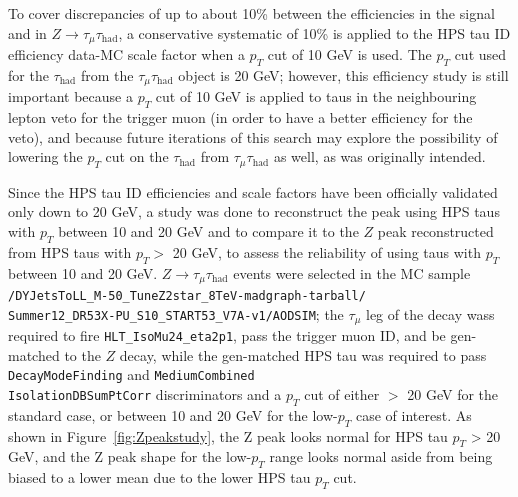 To cover discrepancies of up to about 10\% between the efficiencies in the signal and in $Z\rightarrow\tau_{\mu}\tau_{\text{had}}$, a conservative systematic of 10\% is applied to the HPS tau ID efficiency data-MC scale factor when a $p_T$ cut of 10 GeV is used. The $p_T$ cut used for the $\tau_{\text{had}}$ from the $\tau_{\mu}\tau_{\text{had}}$ object is 20 GeV; however, this efficiency study is still important because a $p_T$ cut of 10 GeV is applied to taus in the neighbouring lepton veto for the trigger muon (in order to have a better efficiency for the veto), and because future iterations of this search may explore the possibility of lowering the $p_T$ cut on the $\tau_{\text{had}}$ from $\tau_{\mu}\tau_{\text{had}}$ as well, as was originally intended.

Since the HPS tau ID efficiencies and scale factors have been officially validated only down to 20 GeV, a study was done to reconstruct the \Z peak using HPS taus with $p_T$ between 10 and 20 GeV and to compare it to the $Z$ peak reconstructed from HPS taus with $p_T >$ 20 GeV, to assess the reliability of using taus with $p_T$ between 10 and 20 GeV. $Z\rightarrow\tau_{\mu}\tau_{\text{had}}$ events were selected in the MC sample \texttt{/DYJetsToLL\_M-50\_TuneZ2star\_8TeV-madgraph-tarball/\\Summer12\_DR53X-PU\_S10\_START53\_V7A-v1/AODSIM}; the $\tau_{\mu}$ leg of the \Z decay wass required to fire \texttt{HLT\_IsoMu24\_eta2p1}, pass the trigger muon ID, and be gen-matched to the $Z$ decay, while the gen-matched HPS tau was required to pass \texttt{DecayModeFinding} and \texttt{MediumCombined\\IsolationDBSumPtCorr} discriminators and a $p_T$ cut of either $>$ 20 GeV for the standard case, or between 10 and 20 GeV for the low-$p_T$ case of interest. As shown in Figure~\ref{fig:Zpeakstudy}, the Z peak looks normal for HPS tau $p_T$ \textgreater\xspace 20 GeV, and the Z peak shape for the low-$p_T$ range looks normal aside from being biased to a lower mean due to the lower HPS tau $p_T$ cut.


